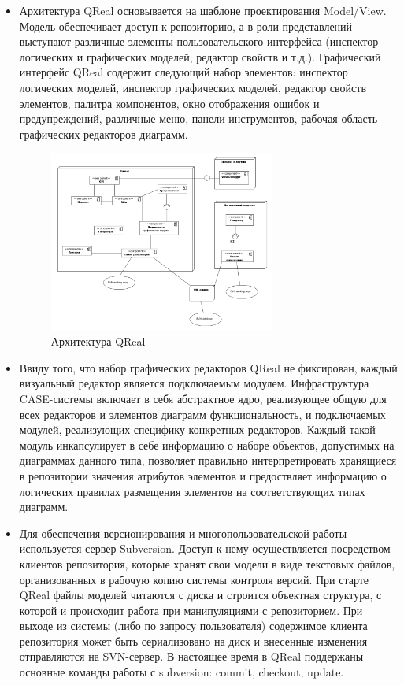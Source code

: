 \documentclass[a4paper]{article}
\begin{document}
\begin{itemize}
  \item Архитектура QReal основывается на шаблоне проектирования Model/View. Модель обеспечивает доступ к репозиторию, а в роли представлений выступают различные элементы пользовательского интерфейса (инспектор логических и графических моделей, редактор свойств и т.д.). Графический интерфейс QReal содержит следующий набор элементов: инспектор логических моделей, инспектор графических моделей, редактор свойств элементов, палитра компонентов, окно отображения ошибок и предупреждений, различные меню, панели инструментов, рабочая область графических редакторов диаграмм.
\begin{figure} [ht]
  \begin{center}
    \includegraphics[width=0.7\textwidth]{01-architecture.png}
    \caption{Архитектура QReal}
    \label{qRealArchitecture}
  \end{center}
\end{figure}
  \item Ввиду того, что набор графических редакторов QReal не фиксирован, каждый визуальный редактор является подключаемым модулем. Инфраструктура CASE-системы включает в себя абстрактное ядро, реализующее общую для всех редакторов и элементов диаграмм функциональность, и подключаемых модулей, реализующих специфику конкретных редакторов. Каждый такой модуль инкапсулирует в себе информацию о наборе объектов, допустимых на диаграммах данного типа, позволяет правильно интерпретировать хранящиеся в репозитории значения атрибутов элементов и предоствляет информацию о логических правилах размещения элементов на соответствующих типах диаграмм.
  \item Для обеспечения версионирования и многопользовательской работы используется сервер Subversion. Доступ к нему осуществляется посредством клиентов репозитория, которые хранят свои модели в виде текстовых файлов, организованных в рабочую копию системы контроля версий. При старте QReal файлы моделей читаются с диска и строится объектная структура, с которой и происходит работа при манипуляциями с репозиторием. При выходе из системы (либо по запросу пользователя) содержимое клиента репозитория может быть сериализовано на диск и внесенные изменения отправляются на SVN-сервер. В настоящее время в QReal поддержаны основные команды работы с subversion: commit, checkout, update. 

\end{itemize}
\end{document}

